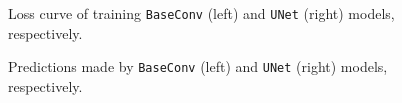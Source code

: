 \documentclass[11pt]{article}
\begin{document}
\begin{figure}[h]
    \centering
    \qquad
    \caption{Loss curve of training \texttt{BaseConv} (left) and \texttt{UNet} (right) models, respectively.}
    \label{fig:loss-BaseConv-UNet]}
\end{figure}


\begin{figure}[h]
    \centering
    \qquad
    \caption{Predictions made by \texttt{BaseConv} (left) and \texttt{UNet} (right) models, respectively.}
    \label{fig:pred-BaseConv-UNet]}
\end{figure}
\end{document}

